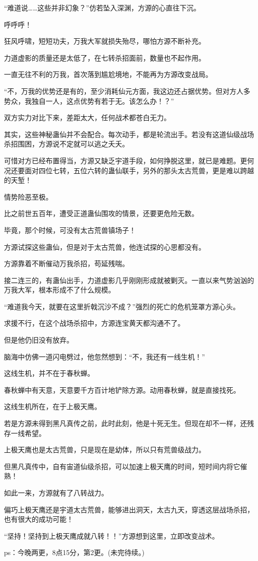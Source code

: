 \begin{this_body}
“难道说……这些并非幻象？”仿若坠入深渊，方源的心直往下沉。

呼呼呼！

狂风呼啸，短短功夫，万我大军就损失殆尽，哪怕方源不断补充。

力道虚影的质量还是太低了，在七转杀招面前，数量也不起作用。

一直无往不利的万我，首次落到尴尬境地，不能再为方源改变战局。

“不，万我的优势还是有的，至少消耗仙元方面，我这边还占据优势。但对方人多势众，我独自一人，这点优势有若于无。该怎么办！？”

双方实力对比下来，差距太大，任何战术都苍白无力。

其实，这些神秘蛊仙并不会配合。每次动手，都是轮流出手。若没有这道仙级战场杀招围困，方源说不定就可以逃之夭夭。

可惜对方已经布置得当，方源又缺乏宇道手段，如何挣脱这里，就已是难题。更何况还要面对四位七转，五位六转的蛊仙联手，另外的那头太古荒兽，更是难以跨越的天堑！

情势险恶至极。

比之前世五百年，遭受正道蛊仙围攻的情景，还要更危险无数。

毕竟，那个时候，可没有太古荒兽镇场子！

方源试探这些蛊仙，但是对于太古荒兽，他连试探的心思都没有。

方源靠着不断催动万我杀招，苟延残喘。

接二连三的，有蛊仙出手，力道虚影几乎刚刚形成就被剿灭。一直以来气势汹汹的万我大军，根本形成不了什么规模。

“难道我今天，就要在这里折戟沉沙不成？”强烈的死亡的危机笼罩方源心头。

求援不行，在这个战场杀招中，方源连宝黄天都沟通不了。

但是他仍旧没有放弃。

脑海中仿佛一道闪电劈过，他忽然想到：“不，我还有一线生机！”

这线生机，并不在于春秋蝉。

春秋蝉中有天意，天意要千方百计地铲除方源。动用春秋蝉，就是直接找死。

这线生机所在，在于上极天鹰。

若是方源未得到黑凡真传之前，此时此刻，他是十死无生。但现在却不一样，还残存一线希望。

上极天鹰也是太古荒兽，只是现在是幼体，所以只有荒兽级战力。

但黑凡真传中，自有宙道仙级杀招，可以加速上极天鹰的时间，短时间内将它催熟！

如此一来，方源就有了八转战力。

偏巧上极天鹰还是宇道太古荒兽，能够进出洞天，太古九天，穿透这层战场杀招，也有很大的成功可能！

“坚持！坚持到上极天鹰成就八转！！”方源想到这里，立即改变战术。

ps：今晚两更，8点15分，第2更。(未完待续。)

\end{this_body}


